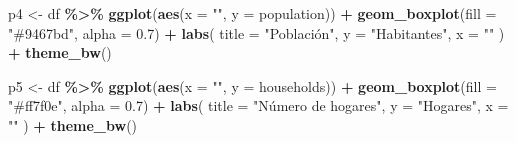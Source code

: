 \documentclass[
]{book}
\newenvironment{Shaded}{\begin{snugshade}}{\end{snugshade}}
\newcommand{\AttributeTok}[1]{\textcolor[rgb]{0.13,0.29,0.53}{#1}}
\newcommand{\FloatTok}[1]{\textcolor[rgb]{0.00,0.00,0.81}{#1}}
\newcommand{\FunctionTok}[1]{\textcolor[rgb]{0.13,0.29,0.53}{\textbf{#1}}}
\newcommand{\NormalTok}[1]{#1}
\newcommand{\OtherTok}[1]{\textcolor[rgb]{0.56,0.35,0.01}{#1}}
\newcommand{\SpecialCharTok}[1]{\textcolor[rgb]{0.81,0.36,0.00}{\textbf{#1}}}
\newcommand{\StringTok}[1]{\textcolor[rgb]{0.31,0.60,0.02}{#1}}
\begin{document}
\begin{Shaded}
\begin{Highlighting}[]
\NormalTok{p4 }\OtherTok{\textless{}{-}}\NormalTok{ df }\SpecialCharTok{\%\textgreater{}\%}
  \FunctionTok{ggplot}\NormalTok{(}\FunctionTok{aes}\NormalTok{(}\AttributeTok{x =} \StringTok{""}\NormalTok{, }\AttributeTok{y =}\NormalTok{ population)) }\SpecialCharTok{+}
  \FunctionTok{geom\_boxplot}\NormalTok{(}\AttributeTok{fill =} \StringTok{"\#9467bd"}\NormalTok{, }\AttributeTok{alpha =} \FloatTok{0.7}\NormalTok{) }\SpecialCharTok{+}
  \FunctionTok{labs}\NormalTok{(}
    \AttributeTok{title =} \StringTok{"Población"}\NormalTok{,}
    \AttributeTok{y =} \StringTok{"Habitantes"}\NormalTok{,}
    \AttributeTok{x =} \StringTok{""}
\NormalTok{  ) }\SpecialCharTok{+}
  \FunctionTok{theme\_bw}\NormalTok{()}
\end{Highlighting}
\end{Shaded}

\begin{Shaded}
\begin{Highlighting}[]
\NormalTok{p5 }\OtherTok{\textless{}{-}}\NormalTok{ df }\SpecialCharTok{\%\textgreater{}\%}
  \FunctionTok{ggplot}\NormalTok{(}\FunctionTok{aes}\NormalTok{(}\AttributeTok{x =} \StringTok{""}\NormalTok{, }\AttributeTok{y =}\NormalTok{ households)) }\SpecialCharTok{+}
  \FunctionTok{geom\_boxplot}\NormalTok{(}\AttributeTok{fill =} \StringTok{"\#ff7f0e"}\NormalTok{, }\AttributeTok{alpha =} \FloatTok{0.7}\NormalTok{) }\SpecialCharTok{+}
  \FunctionTok{labs}\NormalTok{(}
    \AttributeTok{title =} \StringTok{"Número de hogares"}\NormalTok{,}
    \AttributeTok{y =} \StringTok{"Hogares"}\NormalTok{,}
    \AttributeTok{x =} \StringTok{""}
\NormalTok{  ) }\SpecialCharTok{+}
  \FunctionTok{theme\_bw}\NormalTok{()}
\end{Highlighting}
\end{Shaded}
\end{document}
